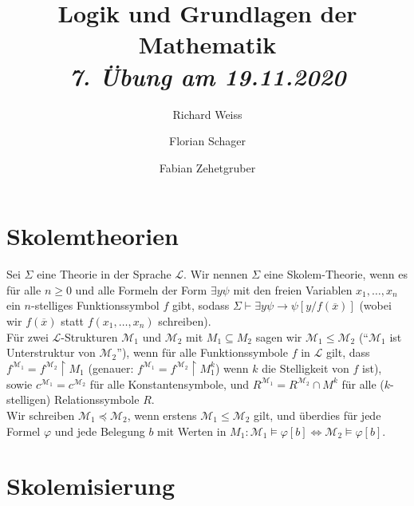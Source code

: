 \documentclass{article}
\title
{
  Logik und Grundlagen der Mathematik \\
  \vspace{4pt}
  \normalsize
  \textit{7. Übung am 19.11.2020}
}
\author
{
  Richard Weiss
  \and
  Florian Schager
  \and
  Fabian Zehetgruber
}
\date{}
\begin{document}
\maketitle
\section*{Skolemtheorien}
Sei $\Sigma$ eine Theorie in der Sprache $\mathscr{L}$. Wir nennen $\Sigma$ eine
Skolem-Theorie, wenn es für alle $n \geq 0$ und alle Formeln der Form $\exists y \psi$
mit den freien Variablen $x_1,\dots,x_n$ ein $n$-stelliges Funktionssymbol $f$ gibt,
sodass $\Sigma \vdash \exists y \psi \rightarrow \psi[y/f(\overline{x})]$ (wobei wir
$f(\overline{x})$ statt $f(x_1,\dots,x_n)$ schreiben). \\
Für zwei $\mathscr{L}$-Strukturen $\mathscr{M}_1$ und $\mathscr{M}_2$ mit $M_1 \subseteq M_2$
sagen wir $\mathscr{M}_1 \leq \mathscr{M}_2$ (``$\mathscr{M}_1$ ist Unterstruktur von $\mathscr{M}_2$''),
wenn für alle Funktionssymbole $f$ in $\mathscr{L}$ gilt, dass
$f^{\mathscr{M}_1} = f^{\mathscr{M}_2}\upharpoonright M_1$ (genauer:
$f^{\mathscr{M}_1} = f^{\mathscr{M}_2}\upharpoonright M_1^k$) wenn $k$ die Stelligkeit von $f$ ist),
sowie $c^{\mathscr{M}_1} = c^{\mathscr{M}_2}$ für alle Konstantensymbole, und
$R^{\mathscr{M}_1} = R^{\mathscr{M}_2}\cap M^k$ für alle ($k$-stelligen) Relationssymbole $R$. \\
Wir schreiben $\mathscr{M}_1 \preccurlyeq \mathscr{M}_2$, wenn erstens $\mathscr{M}_1 \leq \mathscr{M}_2$
gilt, und überdies für jede Formel $\varphi$ und jede Belegung $b$ mit Werten in
$M_1: \mathscr{M}_1 \vDash \varphi[b] \iff \mathscr{M}_2 \vDash \varphi[b]$.




\section*{Skolemisierung}


\end{document}
